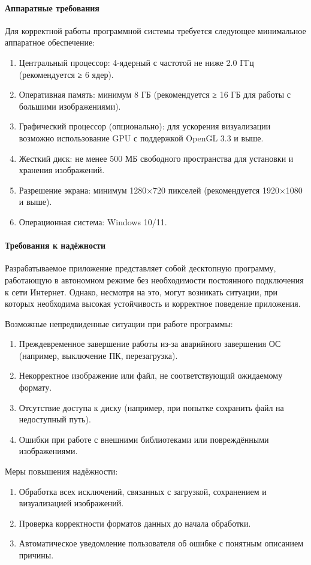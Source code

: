 \paragraph{Аппаратные требования}

Для корректной работы программной системы требуется следующее минимальное аппаратное обеспечение:
\begin{enumerate}
	\item Центральный процессор: 4-ядерный с частотой не ниже 2.0 ГГц (рекомендуется ≥ 6 ядер).
	\item Оперативная память: минимум 8 ГБ (рекомендуется ≥ 16 ГБ для работы с большими изображениями).
	\item Графический процессор (опционально): для ускорения визуализации возможно использование GPU с поддержкой OpenGL 3.3 и выше.
	\item Жесткий диск: не менее 500 МБ свободного пространства для установки и хранения изображений.
	\item Разрешение экрана: минимум 1280×720 пикселей (рекомендуется 1920×1080 и выше).
	\item Операционная система: Windows 10/11.
\end{enumerate}
\paragraph{Требования к надёжности}

Разрабатываемое приложение представляет собой десктопную программу, работающую в автономном режиме без необходимости постоянного подключения к сети Интернет. Однако, несмотря на это, могут возникать ситуации, при которых необходима высокая устойчивость и корректное поведение приложения.

Возможные непредвиденные ситуации при работе программы:
\begin{enumerate}
	\item Преждевременное завершение работы из-за аварийного завершения ОС (например, выключение ПК, перезагрузка).
	\item Некорректное изображение или файл, не соответствующий ожидаемому формату.
	\item Отсутствие доступа к диску (например, при попытке сохранить файл на недоступный путь).
	\item Ошибки при работе с внешними библиотеками или повреждёнными изображениями.
\end{enumerate}

Меры повышения надёжности:
\begin{enumerate}
	\item Обработка всех исключений, связанных с загрузкой, сохранением и визуализацией изображений.
	\item Проверка корректности форматов данных до начала обработки.
	\item Автоматическое уведомление пользователя об ошибке с понятным описанием причины.
\end{enumerate}

